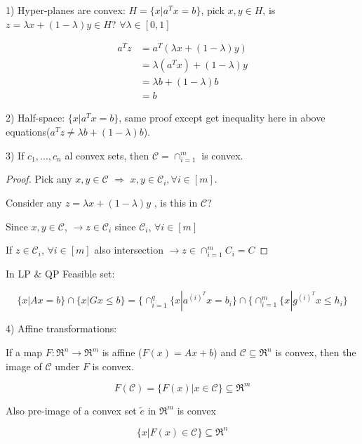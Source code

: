 \begin{example}
	1) Hyper-planes are convex: $H = \{x| a^Tx = b \}$, pick $x,y \in H$, is $z =\lambda x + (1-\lambda)y \in H$? $\forall \lambda \in [0,1]$
	
	\begin{align*}
	a^Tz &= a^T(\lambda x + (1-\lambda)y)\\
	&= \lambda(a^Tx) + (1-\lambda)y\\
	&= \lambda b + (1-\lambda)b\\
	&= b
	\end{align*}
	
	
	2) Half-space: $\{x|a^Tx = b \}$, same proof except get inequality here in above equations($a^Tz \neq \lambda b + (1-\lambda)b$).
	
	3) If $c_1, ..., c_n$ al convex sets, then $\mathcal{C} = \cap^m_{i=1}$ is convex.
	
	\begin{proof}
		Pick any $x,y\in \mathcal{C}$ $\Rightarrow$ $x,y\in \mathcal{C}_i,\forall i\in [m]$.
		
		Consider any $z = \lambda x + (1 - \lambda)y$ , is this in $\mathcal{C}$?
		
		Since $x,y \in \mathcal{C}$, $\rightarrow z\in \mathcal{C}_i$ since $\mathcal{C}_i$, $\forall i\in [m]$
		
		If $z\in \mathcal{C}_i$, $\forall i\in [m]$ also intersection $\rightarrow z\in \cap^m_{i=1}C_i = C$
		
	\end{proof}

	In LP $\&$ QP Feasible set:
	
	\begin{equation*}
	\{x|Ax = b \}\cap \{x|Gx\leq b \} = \{\cap^q_{i=1}\{x|a^{(i)^T}x = b_i  \}\cap \{\cap^m_{i=1}\{x|g^{(i)^T}x \leq h_i \}
	\end{equation*}
	
	4) Affine transformations:
	
	If a map $F: \Re^n \rightarrow \Re^m$ is affine ($F(x) = Ax + b$) and $\mathcal{C} \subseteq \Re^n$ is convex, then the image of $\mathcal{C}$ under $F$ is convex.
	
	\begin{equation*}
	F(\mathcal{C}) = \{F(x) | x\in \mathcal{C} \} \subseteq \Re^m
	\end{equation*}

	Also pre-image of a convex set $\tilde{e}$ in $\Re^m$ is convex
	
	\begin{equation*}
	\{x|F(x)\in \mathcal{C} \} \subseteq \Re^n
	\end{equation*}
\end{example}

